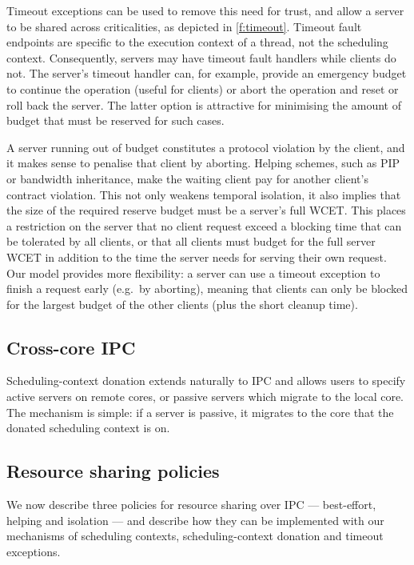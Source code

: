 Timeout exceptions can be used to remove this need for trust, and
allow a server to be shared across criticalities, as depicted in \cref{f:timeout}. Timeout fault endpoints are specific to the
execution context of a thread, not the scheduling context. Consequently, servers may have timeout
fault handlers while clients do not. The 
server's timeout handler can, for example, provide an emergency budget
to continue the operation (useful for  clients) or abort
the operation and reset or roll back the server. The latter option is
attractive for minimising the amount of budget that must be reserved
for such cases.

A server running out of budget constitutes a protocol violation
by the client, and it makes sense to penalise that
client by aborting. Helping schemes, such as PIP or bandwidth
inheritance,
make the waiting client pay for
another client's contract violation. This not only weakens temporal isolation,
it also implies that the size of the required reserve budget
must be a server's full WCET. This places a restriction on the server
that no client request exceed a blocking time that can be tolerated by
all clients, or that all clients must budget for the full server WCET in
addition to the time the server needs for serving their own request.
Our model provides more flexibility: a server can use a timeout
exception to finish a request early (e.g.\ by aborting), meaning that clients can only be
blocked for the largest budget of the other clients (plus the short
cleanup time).

\subsection{Cross-core IPC}


Scheduling-context donation extends naturally to IPC and allows users to specify active servers on
remote cores, or passive servers which migrate to the local core. The mechanism is simple: if a
server is passive, it migrates to the core that the donated scheduling context is on. 

\subsection{Resource sharing policies}

We now describe three policies for resource sharing over \gls{IPC} --- best-effort, helping and
isolation --- and describe how they can be implemented 
with our mechanisms of scheduling contexts, scheduling-context donation and timeout exceptions.


